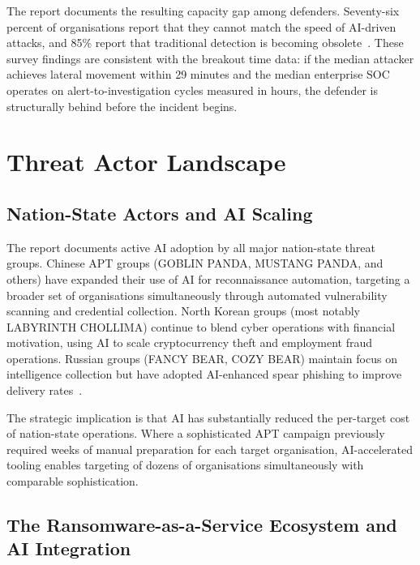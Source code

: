\documentclass[journal]{IEEEtran}
\begin{document}
The report documents the resulting capacity gap among defenders. Seventy-six percent
of organisations report that they cannot match the speed of AI-driven attacks, and
85\% report that traditional detection is becoming obsolete~\cite{cs2026ransomware}.
These survey findings are consistent with the breakout time data: if the median
attacker achieves lateral movement within 29 minutes and the median enterprise SOC
operates on alert-to-investigation cycles measured in hours, the defender is
structurally behind before the incident begins.

\section{Threat Actor Landscape}

\subsection{Nation-State Actors and AI Scaling}

The report documents active AI adoption by all major nation-state threat groups.
Chinese APT groups (GOBLIN PANDA, MUSTANG PANDA, and others) have expanded their
use of AI for reconnaissance automation, targeting a broader set of organisations
simultaneously through automated vulnerability scanning and credential collection.
North Korean groups (most notably LABYRINTH CHOLLIMA) continue to blend cyber
operations with financial motivation, using AI to scale cryptocurrency theft and
employment fraud operations. Russian groups (FANCY BEAR, COZY BEAR) maintain
focus on intelligence collection but have adopted AI-enhanced spear phishing to
improve delivery rates~\cite{cs2026press}.

The strategic implication is that AI has substantially reduced the per-target cost
of nation-state operations. Where a sophisticated APT campaign previously required
weeks of manual preparation for each target organisation, AI-accelerated tooling
enables targeting of dozens of organisations simultaneously with comparable
sophistication.

\subsection{The Ransomware-as-a-Service Ecosystem and AI Integration}
\end{document}
